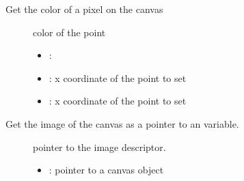 \documentclass[letterpaper,10pt,english]{sphinxmanual}
\begin{document}
\begin{fulllineitems}
\label{\detokenize{object-types/canvas:_CPPv416lv_canvas_get_pxP8lv_obj_t10lv_coord_t10lv_coord_t}}%
\pysigstartmultiline
{}\label{\detokenize{object-types/canvas:lv__canvas_8h_1a239cd4f0a242aff85570021edf6e40e8}}%
\pysigstopmultiline
Get the color of a pixel on the canvas \begin{description}
\item[{}] \leavevmode
color of the point 

\item[{}] \leavevmode\begin{itemize}
\item {} 
: 

\item {} 
: x coordinate of the point to set 

\item {} 
: x coordinate of the point to set 

\end{itemize}

\end{description}


\end{fulllineitems}


\begin{fulllineitems}
\label{\detokenize{object-types/canvas:_CPPv417lv_canvas_get_imgP8lv_obj_t}}%
\pysigstartmultiline
{}\label{\detokenize{object-types/canvas:lv__canvas_8h_1ab88808b96446336d7c25436d4e7c8d75}}%
\pysigstopmultiline
Get the image of the canvas as a pointer to an  variable. \begin{description}
\item[{}] \leavevmode
pointer to the image descriptor. 

\item[{}] \leavevmode\begin{itemize}
\item {} 
: pointer to a canvas object 

\end{itemize}

\end{description}


\end{fulllineitems}
\end{document}
